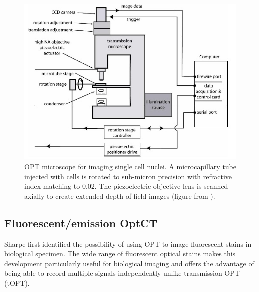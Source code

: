 \documentclass[12pt]{article}
\begin{document}



\begin{figure}[H]
\centering
\includegraphics[scale=0.8]{Fauver_2005_setup.jpg}
\caption{OPT microscope for imaging single cell nuclei. A microcapillary tube injected with cells is rotated to sub-micron precision with refractive index matching  to 0.02. The piezoelectric objective lens is scanned axially to create extended depth of field images (figure from \cite{Fauver:2005}).}
\label{fig:fauver_setup}
\end{figure}





\subsection{Fluorescent/emission  OptCT}
\label{subsec:eOPT}

Sharpe first identified the possibility of using OPT to image fluorescent stains in biological specimen. \cite{Sharpe:2002jp} The wide range of fluorescent optical stains makes this development particularly useful for biological imaging and offers the advantage of being able to record multiple signals independently unlike  transmission OPT (tOPT). \cite{Sharpe:2002jp} 

\end{document}
